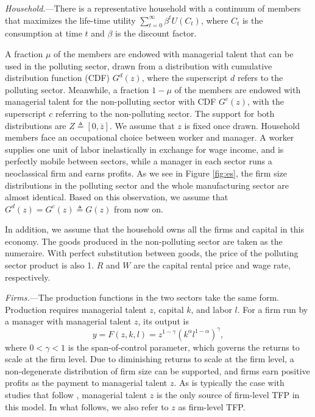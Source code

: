 \documentclass[AEJ]{AEA}
\begin{document}
\textit{Household.}---There is a representative household with a continuum of members that maximizes the life-time utility $\sum_{t=0}^{\infty} \beta^t U(C_t)$, where $C_t$ is the consumption at time $t$ and $\beta$ is the discount factor.

A fraction $\mu$ of the members are endowed with managerial talent that can be used in the polluting sector, drawn from a distribution with cumulative distribution function (CDF) $G^{d}(z)$, where the superscript $d$ refers to the polluting sector. Meanwhile, a fraction $1-\mu$ of the members are endowed with managerial talent for the non-polluting sector with CDF $G^{c}(z)$, with the superscript $c$ referring to the non-polluting sector. The support for both distributions are $Z \triangleq [0,\overline{z}]$. We assume that $z$ is fixed once drawn. Household members face an occupational choice between {worker} and {manager}. A worker supplies one unit of labor inelastically in exchange for wage income, and is perfectly mobile between sectors, while a manager in each sector runs a neoclassical firm and earns profits. As we see in Figure \ref{fig:es}, the firm size distributions in the polluting sector and the whole manufacturing sector are almost identical. Based on this observation, we assume that $G^{d}(z) = G^{c}(z) \triangleq G(z)$ from now on.

In addition, we assume that the household owns all the firms and capital in this economy. The goods produced in the non-polluting sector are taken as the numeraire. With perfect substitution between goods, the price of the polluting sector product is also 1. $R$ and $W$ are the capital rental price and wage rate, respectively.

\textit{Firms.}---The production functions in the two sectors take the same form. Production requires managerial talent $z$, capital $k$, and labor $l$. For a firm run by a manager with managerial talent $z$, its output is
\begin{equation*}
    y = F(z,k,l) = z^{1-\gamma} (k^{\alpha}l^{1-\alpha})^{\gamma},
\end{equation*}
where $0<\gamma<1$ is the span-of-control parameter, which governs the returns to scale at the firm level. Due to diminishing returns to scale at the firm level, a non-degenerate distribution of firm size can be supported, and firms earn positive profits as the payment to managerial talent $z$. As is typically the case with studies that follow \citet{Lucas:1978b}, managerial talent $z$ is the only source of firm-level TFP in this model. In what follows, we also refer to $z$ as firm-level TFP.
\end{document}
